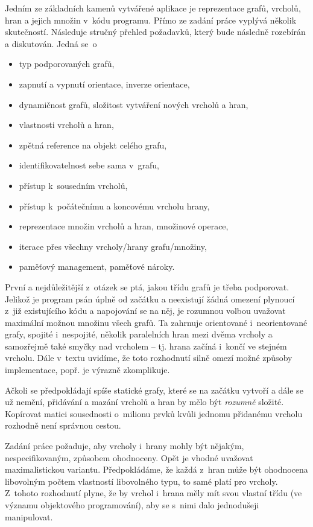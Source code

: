 \documentclass[11pt,twoside,a4paper]{book}
\begin{document}
Jedním ze základních kamenů vytvářené aplikace je reprezentace grafů, vrcholů, hran a jejich množin v~kódu programu. Přímo ze zadání práce vyplývá několik skutečností. Následuje stručný přehled požadavků, který bude následně rozebírán a diskutován. Jedná se~o

\begin{itemize}
\item typ podporovaných grafů,
\item zapnutí a vypnutí orientace, inverze orientace,
\item dynamičnost grafů, složitost vytváření nových vrcholů a hran,
\item vlastnosti vrcholů a hran,
\item zpětná reference na objekt celého grafu,
\item identifikovatelnost sebe sama v~grafu,
\item přístup k~sousedním vrcholů,
\item přístup k~počátečnímu a koncovému vrcholu hrany,
\item reprezentace množin vrcholů a hran, množinové operace,
\item iterace přes všechny vrcholy/hrany grafu/množiny,
\item paměťový management, paměťové nároky.
\end{itemize}

První a nejdůležitější z~otázek se ptá, jakou třídu grafů je třeba podporovat. Jelikož je program psán úplně od začátku a neexistují žádná omezení plynoucí z~již existujícího kódu a napojování se na něj, je rozumnou volbou uvažovat maximální možnou množinu všech grafů. Ta zahrnuje orientované i~neorientované grafy, spojité i~nespojité, několik paralelních hran mezi dvěma vrcholy a samozřejmě také smyčky nad vrcholem -- tj. hrana začíná i~končí ve stejném vrcholu. Dále v~textu uvidíme, že toto rozhodnutí silně omezí možné způsoby implementace, popř. je výrazně zkomplikuje.

Ačkoli se předpokládají spíše statické grafy, které se na začátku vytvoří a dále se už nemění, přidávání a mazání vrcholů a hran by mělo být \textit{rozumně} složité. Kopírovat matici sousednosti o~milionu prvků kvůli jednomu přidanému vrcholu rozhodně není správnou cestou.

Zadání práce požaduje, aby vrcholy i~hrany mohly být nějakým, nespecifikovaným, způsobem ohodnoceny. Opět je vhodné uvažovat maximalistickou variantu. Předpokládáme, že každá z~hran může být ohodnocena libovolným počtem vlastností libovolného typu, to samé platí pro vrcholy. Z~tohoto rozhodnutí plyne, že by vrchol i~hrana měly mít svou vlastní třídu (ve významu objektového programování), aby se s~nimi dalo jednodušeji manipulovat.
\end{document}
